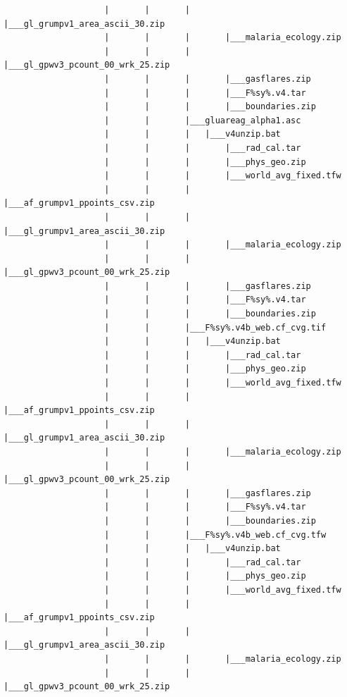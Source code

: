 \documentclass[
]{book}
\begin{document}
\begin{verbatim}
                    |       |       |       |___gl_grumpv1_area_ascii_30.zip
                    |       |       |       |___malaria_ecology.zip
                    |       |       |       |___gl_gpwv3_pcount_00_wrk_25.zip
                    |       |       |       |___gasflares.zip
                    |       |       |       |___F%sy%.v4.tar
                    |       |       |       |___boundaries.zip
                    |       |       |___gluareag_alpha1.asc
                    |       |       |   |___v4unzip.bat
                    |       |       |       |___rad_cal.tar
                    |       |       |       |___phys_geo.zip
                    |       |       |       |___world_avg_fixed.tfw
                    |       |       |       |___af_grumpv1_ppoints_csv.zip
                    |       |       |       |___gl_grumpv1_area_ascii_30.zip
                    |       |       |       |___malaria_ecology.zip
                    |       |       |       |___gl_gpwv3_pcount_00_wrk_25.zip
                    |       |       |       |___gasflares.zip
                    |       |       |       |___F%sy%.v4.tar
                    |       |       |       |___boundaries.zip
                    |       |       |___F%sy%.v4b_web.cf_cvg.tif
                    |       |       |   |___v4unzip.bat
                    |       |       |       |___rad_cal.tar
                    |       |       |       |___phys_geo.zip
                    |       |       |       |___world_avg_fixed.tfw
                    |       |       |       |___af_grumpv1_ppoints_csv.zip
                    |       |       |       |___gl_grumpv1_area_ascii_30.zip
                    |       |       |       |___malaria_ecology.zip
                    |       |       |       |___gl_gpwv3_pcount_00_wrk_25.zip
                    |       |       |       |___gasflares.zip
                    |       |       |       |___F%sy%.v4.tar
                    |       |       |       |___boundaries.zip
                    |       |       |___F%sy%.v4b_web.cf_cvg.tfw
                    |       |       |   |___v4unzip.bat
                    |       |       |       |___rad_cal.tar
                    |       |       |       |___phys_geo.zip
                    |       |       |       |___world_avg_fixed.tfw
                    |       |       |       |___af_grumpv1_ppoints_csv.zip
                    |       |       |       |___gl_grumpv1_area_ascii_30.zip
                    |       |       |       |___malaria_ecology.zip
                    |       |       |       |___gl_gpwv3_pcount_00_wrk_25.zip

\end{verbatim}
\end{document}
